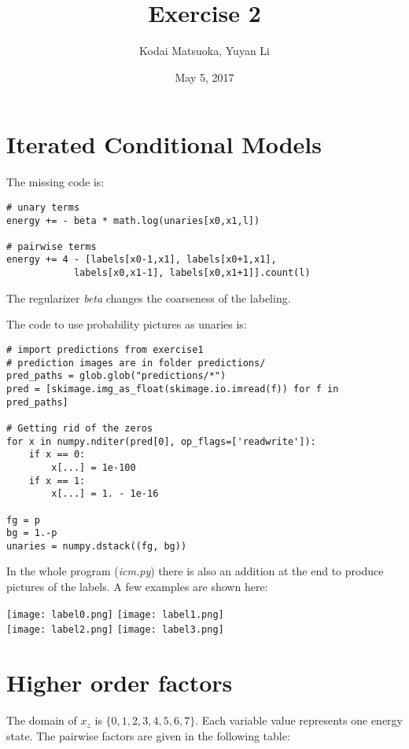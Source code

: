 \documentclass[12pt,a4paper]{scrartcl}
\author{Kodai Matsuoka, Yuyan Li}
\title{Exercise 2}
\date{May 5, 2017}
\begin{document}
\maketitle

\section{Iterated Conditional Models}

The missing code is:

\begin{verbatim}
# unary terms
energy += - beta * math.log(unaries[x0,x1,l])

# pairwise terms
energy += 4 - [labels[x0-1,x1], labels[x0+1,x1],
            labels[x0,x1-1], labels[x0,x1+1]].count(l)
\end{verbatim}

The regularizer \textit{beta} changes the coarseness of the labeling.

The code to use probability pictures as unaries is:

\begin{verbatim}
# import predictions from exercise1
# prediction images are in folder predictions/
pred_paths = glob.glob("predictions/*")
pred = [skimage.img_as_float(skimage.io.imread(f)) for f in pred_paths]

# Getting rid of the zeros
for x in numpy.nditer(pred[0], op_flags=['readwrite']):
    if x == 0:
        x[...] = 1e-100
    if x == 1:
        x[...] = 1. - 1e-16

fg = p
bg = 1.-p
unaries = numpy.dstack((fg, bg))
\end{verbatim}

In the whole program (\textit{icm.py}) there is also an addition at the end to produce pictures of the labels. A few examples are shown here:

\texttt{[image: label0.png]}
\texttt{[image: label1.png]}
\\
\texttt{[image: label2.png]}
\texttt{[image: label3.png]}
\\
% 

\section{Higher order factors}
The domain of $x_z$ is $\{0,1,2,3,4,5,6,7\}$. Each variable value represents one energy state. The pairwise factors are given in the following table:
\end{document}
